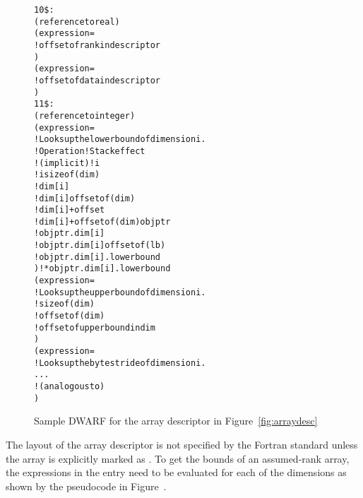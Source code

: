 \begin{figure}[!h]
\begin{dwflisting}
\begin{alltt}
10\$:  \DWTAGarraytype
         \DWATtype(reference to real)
         \DWATrank(expression=
             \DWOPpushobjectaddress
             \DWOPlitn                        ! offset of rank in descriptor
             \DWOPplus
             \DWOPderef)
         \DWATdatalocation(expression=
             \DWOPpushobjectaddress
             \DWOPlitn                        ! offset of data in descriptor
             \DWOPplus
             \DWOPderef)
11\$:    \DWTAGgenericsubrange
             \DWATtype(reference to integer)
             \DWATlowerbound(expression=
             !   Looks up the lower bound of dimension i.
             !   Operation                       ! Stack effect
             !   (implicit)                      ! i                                                                     
                 \DWOPlitn                    ! i sizeof(dim)
                 \DWOPmul                       ! dim[i]
                 \DWOPlitn                    ! dim[i] offsetof(dim)
                 \DWOPplus                      ! dim[i]+offset
                 \DWOPpushobjectaddress       ! dim[i]+offsetof(dim) objptr
                 \DWOPplus                      ! objptr.dim[i]
                 \DWOPlitn                    ! objptr.dim[i] offsetof(lb)
                 \DWOPplus                      ! objptr.dim[i].lowerbound
                 \DWOPderef)                    ! *objptr.dim[i].lowerbound
             \DWATupperbound(expression=
             !   Looks up the upper bound of dimension i.
                 \DWOPlitn                    ! sizeof(dim)
                 \DWOPmul
                 \DWOPlitn                    ! offsetof(dim)
                 \DWOPplus
                 \DWOPpushobjectaddress
                 \DWOPplus
                 \DWOPlitn                    ! offset of upperbound in dim
                 \DWOPplus
                 \DWOPderef)
             \DWATbytestride(expression=
             !   Looks up the byte stride of dimension i.
                 ...
             !   (analogous to \DWATupperboundNAME)
                 )
\end{alltt}
\end{dwflisting}
\caption{Sample DWARF for the array descriptor in Figure~\ref{fig:arraydesc}}
\label{fig:assumedrankdwarf}
\end{figure}

The layout of the array descriptor is not specified by the Fortran
standard unless the array is explicitly marked as . To
get the bounds of an assumed-rank array, the expressions in the
\DWTAGgenericsubrange{}
entry need to be evaluated for each of the
\DWATrank{} dimensions as shown by the pseudocode in
Figure~.

